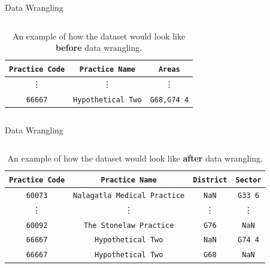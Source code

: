\documentclass[hyperref={breaklinks,colorlinks,
   urlcolor=blue,citecolor=blue,linkcolor=red}]{beamer}
\begin{document}
\begin{frame}{Data Wrangling}
\begin{columns}
\begin{column}{\dimexpr\paperwidth-10pt}
\begin{table}
\begin{center}
\begin{tabular}{c | c | c}
\toprule
\texttt{Practice Code} & \texttt{Practice Name} & \texttt{Areas} \\
\midrule
\midrule
\vdots & \vdots & \vdots\\
\texttt{66667} & \texttt{Hypothetical Two} & \texttt{G68,G74 4}\\ 
\bottomrule
\end{tabular}
\caption{An example of how the dataset would look like \textbf{before} data wrangling.}
\end{center}
\end{table}
\end{column}
\end{columns}
\end{frame}

\begin{frame}{Data Wrangling}
\begin{columns}
\begin{column}{\dimexpr\paperwidth-10pt}
\begin{table}
\begin{center}
\begin{tabular}{c | c | c |c}
\toprule
\texttt{Practice Code} & \texttt{Practice Name} & \texttt{District} & \texttt{Sector} \\
\midrule
\midrule
\texttt{60073} & \texttt{Nalagatla Medical Practice} & \texttt{NaN} & \texttt{G33 6}\\
\vdots & \vdots & \vdots & \vdots\\
\texttt{60092} & \texttt{The Stonelaw Practice} & \texttt{G76} & \texttt{NaN}\\
\texttt{66667} & \texttt{Hypothetical Two} & \texttt{NaN} & \texttt{G74 4}\\
\texttt{66667} & \texttt{Hypothetical Two} & \texttt{G68} & \texttt{NaN}\\ 
\bottomrule
\end{tabular}
\caption{An example of how the dataset would look like \textbf{after} data wrangling.}
\end{center}
\end{table}
\end{column}
\end{columns}
\end{frame}
\end{document}
